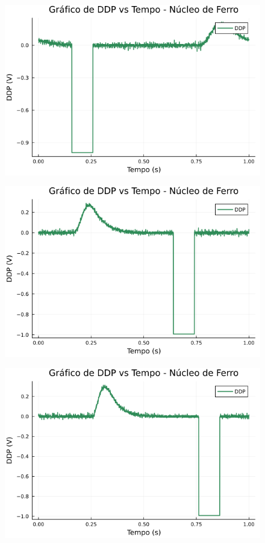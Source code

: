 \begin{center}
\begin{multicols}{2}
\begin{figure}[H]
    \centering
    \includegraphics[width=1.0\linewidth]{figuras/grafico_dados3_F0000CH1.png}
\end{figure}

\begin{figure}[H]
    \centering
    \includegraphics[width=1.0\linewidth]{figuras/grafico_dados3_F0001CH1.png}
\end{figure}

\begin{figure}[H]
    \centering
    \includegraphics[width=1.0\linewidth]{figuras/grafico_dados3_F0002CH1.png}
\end{figure}


\end{multicols}
\end{center}
